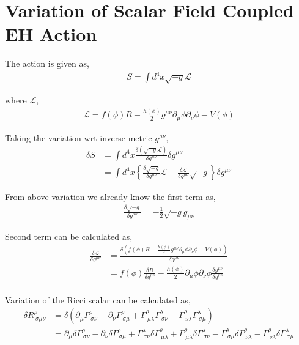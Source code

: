 \section{Variation of Scalar Field Coupled EH Action}

The action is given as,
\begin{align}
    S = \int d^{4}x\sqrt{-g}\mathcal{L}
\end{align}

where $\mathcal{L}$,
\begin{align}
    \mathcal{L} = f\left(\phi\right)R - \frac{h\left(\phi\right)}{2}g^{\mu\nu}\partial_{\mu}\phi\partial_{\nu}\phi - V\left(\phi\right)
\end{align}

Taking the variation wrt inverse metric $g^{\mu\nu}$,
\begin{align}
    \delta S &= \int d^{4}x\frac{\delta \left(\sqrt{-g}\mathcal{L}\right)}{\delta g^{\mu\nu}}\delta g^{\mu\nu}\\
    \label{eq:var}
    &= \int d^{4}x\left\{\frac{\delta\sqrt{-g}}{\delta g^{\mu\nu}}\mathcal{L} + \frac{\delta\mathcal{L}}{\delta g^{\mu\nu}}\sqrt{-g}\right\}\delta g^{\mu\nu}
\end{align}

From above variation we already know the first term as,
\begin{align}
    \frac{\delta \sqrt{-g}}{\delta g^{\mu\nu}} = -\frac{1}{2}\sqrt{-g}g_{\mu\nu}
\end{align}

Second term can be calculated as,
\begin{align}
    \frac{\delta \mathcal{L}}{\delta g^{\mu\nu}} &= \frac{\delta\left(f\left(\phi\right)R - \frac{h\left(\phi\right)}{2}g^{\mu\nu}\partial_{\mu}\phi\partial_{\nu}\phi - V\left(\phi\right)\right)}{\delta g^{\mu\nu}}\\
    &= f\left(\phi\right)\frac{\delta R}{\delta g^{\mu\nu}} - \frac{h\left(\phi\right)}{2}\partial_{\mu}\phi\partial_{\nu}\phi\frac{\delta g^{\mu\nu}}{\delta g^{\mu\nu}}\\
\end{align}

Variation of the Ricci scalar can be calculated as,
\begin{align}
    \delta R^{\rho}_{\ \sigma\mu\nu} &= \delta\left(\partial_{\mu}\Gamma^{\rho}_{\ \sigma\nu} - \partial_{\nu}\Gamma^{\rho}_{\ \sigma\mu} + \Gamma^{\rho}_{\ \mu\lambda}\Gamma^{\lambda}_{\ \sigma\nu} - \Gamma^{\rho}_{\ \nu\lambda}\Gamma^{\lambda}_{\ \sigma\mu}\right)\\
    &= \partial_{\mu}\delta\Gamma^{\rho}_{\ \sigma\nu} - \partial_{\nu}\delta\Gamma^{\rho}_{\ \sigma\mu} + \Gamma^{\lambda}_{\ \sigma\nu}\delta\Gamma^{\rho}_{\ \mu\lambda} + \Gamma^{\rho}_{\ \mu\lambda}\delta\Gamma^{\lambda}_{\ \sigma\nu} - \Gamma^{\lambda}_{\ \sigma\mu}\delta\Gamma^{\rho}_{\ \nu\lambda} - \Gamma^{\rho}_{\ \nu\lambda}\delta\Gamma^{\lambda}_{\ \sigma\mu}\\
\end{align}

